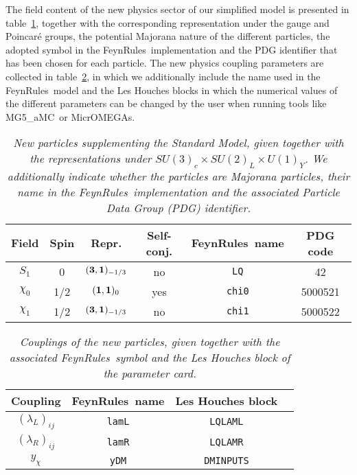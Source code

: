 \documentclass[aps,onecolumn,amsmath,amsfonts,amssymb,nofootinbib,eqsecnum,%
  secnumarabic,notitlepage]{revtex4-1}
\def\sss{\scriptscriptstyle}
\def\ydm{y_{\sss \chi}}
\newcommand{\fr}{{\sc \small FeynRules}}
\newcommand{\mg}{{\sc\small MG5\_aMC}}
\newcommand{\micromegas}{{\sc\small MicrOMEGAs}}
\begin{document}
The field content of the new physics sector of our simplified model is
presented in table~\ref{tab:fields}, together with the corresponding
representation under the gauge and Poincar\'e groups, the potential Majorana
nature of the different particles, the adopted symbol in the \fr\
implementation and the PDG identifier that has been chosen for
each particle. The new physics coupling parameters are collected in
table~\ref{tab:params}, in which we additionally include the name used in the
\fr\ model and the Les Houches blocks in which the numerical values of
the different parameters can be changed by the user when running tools like
\mg\ or \micromegas.

\begin{table}[h]
\renewcommand{\arraystretch}{1.4}
\setlength\tabcolsep{8pt}
\begin{tabular}{c c c c c c}
  Field & Spin & Repr. & Self-conj. & \fr\ name & PDG code\\
  \hline\hline
  $S_1$    & 0   & $({\bf 3}, {\bf 1})_{-1/3}$ & no  & {\tt LQ} & 42\\
  $\chi_0$ & 1/2 & $({\bf 1}, {\bf 1})_0$      & yes & {\tt chi0} & 5000521\\
  $\chi_1$ & 1/2 & $({\bf 3}, {\bf 1})_{-1/3}$ & no  & {\tt chi1} & 5000522\\
\end{tabular}
\caption{\it New particles supplementing the Standard Model, given
  together with the representations under $SU(3)_c\times SU(2)_L \times U(1)_Y$.
  We additionally indicate whether the particles are Majorana particles,
  their name in the \fr\ implementation and the associated Particle Data Group
  (PDG) identifier.}
\label{tab:fields}
\end{table}

\begin{table}[h]
\renewcommand{\arraystretch}{1.4}
\setlength\tabcolsep{15pt}
\begin{tabular}{c c c c}
  Coupling & \fr\ name & Les Houches block\\
  \hline\hline
  $(\lambda_{\sss L})_{ij}$ & {\tt lamL} & {\tt LQLAML}\\
  $(\lambda_{\sss R})_{ij}$ & {\tt lamR} & {\tt LQLAMR}\\
  $\ydm$ & {\tt yDM} & {\tt DMINPUTS}\\
\end{tabular}
\caption{\it Couplings of the new particles, given together with the associated
  \fr\ symbol and the Les Houches block of the parameter card.}
\label{tab:params}
\end{table}

\end{document}
